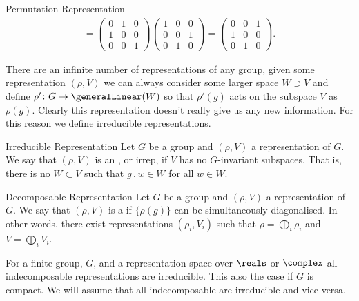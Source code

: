 \documentclass[fleqn]{NotesClass}
\newcommand{\action}{\mathbin{.}}
\begin{document}
\begin{exm}{Permutation Representation}{}
\begin{multline}
            = 
            \begin{pmatrix}
                0 & 1 & 0\\
                1 & 0 & 0\\
                0 & 0 & 1
            \end{pmatrix}
            \begin{pmatrix}
                1 & 0 & 0\\
                0 & 0 & 1\\
                0 & 1 & 0
            \end{pmatrix}
            = 
            \begin{pmatrix}
                0 & 0 & 1\\
                1 & 0 & 0\\
                0 & 1 & 0
            \end{pmatrix}
            .
        \end{multline}
    \end{exm}
    
    There are an infinite number of representations of any group, given some representation \((\rho, V)\) we can always consider some larger space \(W \supset V\) and define \(\rho' \colon G \to \generalLinear(W)\) so that \(\rho'(g)\) acts on the subspace \(V\) as \(\rho(g)\).
    Clearly this representation doesn't really give us any new information.
    For this reason we define irreducible representations.
    
    \begin{dfn}{Irreducible Representation}{}
        Let \(G\) be a group and \((\rho, V)\) a representation of \(G\).
        We say that \((\rho, V)\) is an , or irrep, if \(V\) has no \(G\)-invariant subspaces.
        That is, there is no \(W \subset V\) such that \(g \action w \in W\) for all \(w \in W\).
    \end{dfn}

    \begin{dfn}{Decomposable Representation}{}
        Let \(G\) be a group and \((\rho, V)\) a representation of \(G\).
        We say that \((\rho, V)\) is a  if \(\{\rho(g)\}\) can be simultaneously diagonalised.
        In other words, there exist representations \((\rho_i, V_i)\) such that \(\rho = \bigoplus_i \rho_i\) and \(V = \bigoplus_i V_i\).
    \end{dfn}
    
    For a finite group, \(G\), and a representation space over \(\reals\) or \(\complex\) all indecomposable representations are irreducible.
    This also the case if \(G\) is compact.
    We will assume that all indecomposable are irreducible and vice versa.
    
\end{document}
